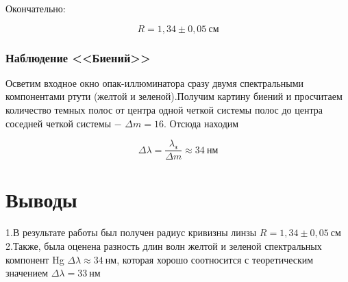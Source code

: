 \documentclass[a4paper,12pt]{article}
\begin{document}
Окончательно: 

$$
R = 1,34 \pm 0,05 \ см
$$

\subsubsection*{Наблюдение <<Биений>>}

Осветим входное окно опак-иллюминатора сразу двумя спектральными компонентами ртути (желтой и зеленой).Получим картину биений и просчитаем количество темных полос от центра одной четкой системы полос до центра соседней четкой системы $-$ $\Delta m = 16$. Отсюда находим

$$
\Delta \lambda = \frac{\lambda_{з}}{\Delta m} \approx 34 \ нм
$$

\section*{Выводы}

1.В результате работы был получен радиус кривизны линзы $ R = 1,34 \pm 0,05 \ см$
\\
2.Также, была оценена разность длин волн желтой и зеленой спектральных компонент Hg $\Delta \lambda \approx 34 \ нм$, которая хорошо соотносится с теоретическим значением $\Delta \lambda = 33 \ нм$
\end{document}
